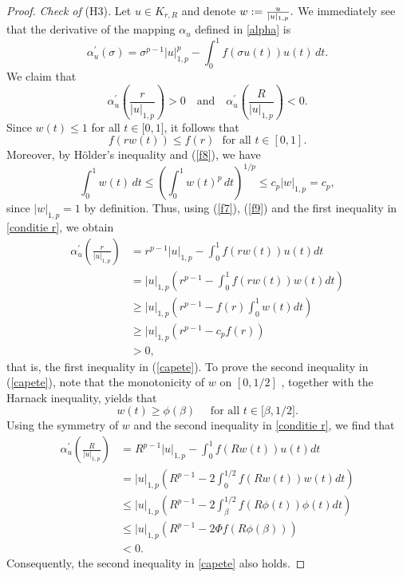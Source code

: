 \documentclass{birkjour}
\theoremstyle{definition}
\theoremstyle{remark}
\numberwithin{equation}{section}
\begin{document}
\begin{proof}
\textit{Check of }(H3)\textit{.} Let $u\in K_{r,R}$ and denote $w:=\frac{u}{%
|u|_{1,p}}.$ We immediately see that the derivative of the mapping $\alpha
_{u}$ defined in \eqref{alpha} is
\begin{equation*}
\alpha _{u}^{\prime }\left( \sigma \right) =\sigma
^{p-1}|u|_{1,p}^{p}-\int_{0}^{1}f(\sigma u(t))u(t)\,dt.
\end{equation*}%
We claim that
\begin{equation}
\alpha _{u}^{\prime }\left( \frac{r}{|u|_{1,p}}\right) >0\quad \text{and}%
\quad \alpha _{u}^{\prime }\left( \frac{R}{|u|_{1,p}}\right) <0.
\label{capete}
\end{equation}%
Since $w(t)\leq 1$ for all $t\in \lbrack 0,1]$, it follows that
\begin{equation}
f(rw(t))\leq f(r)\ \ \ \text{for all\ }t\in \left[ 0,1\right] .  \label{f7}
\end{equation}%
Moreover, by H\"{o}lder's inequality and (\ref{f8}), we have
\begin{equation}
\int_{0}^{1}w(t)\,dt\leq \left( \int_{0}^{1}w(t)^{p}\,dt\right) ^{1/p}\leq
c_{p}|w|_{1,p}=c_{p},  \label{f9}
\end{equation}%
since $|w|_{1,p}=1$ by definition. Thus, using (\ref{f7}), (\ref{f9}) and
the first inequality in \eqref{conditie r}, we obtain
\begin{align*}
\alpha _{u}^{\prime }\left( \frac{r}{|u|_{1,p}}\right) &
=r^{p-1}|u|_{1,p}-\int_{0}^{1}f(rw(t))u(t)dt \\
& =|u|_{1,p}\left( r^{p-1}-\int_{0}^{1}f(rw(t))w(t)dt\right) \\
& \geq |u|_{1,p}\left( r^{p-1}-f(r)\int_{0}^{1}w(t)dt\right) \\
& \geq |u|_{1,p}\left( r^{p-1}-c_{p}f(r)\right) \\
& >0,
\end{align*}%
that is, the first inequality in (\ref{capete}). To prove the second
inequality in (\ref{capete}), note that the monotonicity of $w$ on $[0,1/2]$%
, together with the Harnack inequality, yields that
\begin{equation}
w(t)\geq \phi (\beta )\quad \text{ for all $t\in \lbrack \beta ,1/2]$}.
\label{inegalitate w}
\end{equation}%
Using the symmetry of $w$ and the second inequality in \eqref{conditie r},
we find that
\begin{align*}
\alpha _{u}^{\prime }\left( \frac{R}{|u|_{1,p}}\right) &
=R^{p-1}|u|_{1,p}-\int_{0}^{1}f(Rw(t))u(t)dt \\
& =|u|_{1,p}\left( R^{p-1}-2\int_{0}^{1/2}f(Rw(t))w(t)dt\right) \\
& \leq |u|_{1,p}\left( R^{p-1}-2\int_{\beta }^{1/2}f(R\phi (t))\phi
(t)dt\right) \\
& \leq |u|_{1,p}\left( R^{p-1}-2\Phi f(R\phi (\beta ))\right) \\
& <0.
\end{align*}%
Consequently, the second inequality in \eqref{capete} also holds.


\end{proof}
\end{document}
